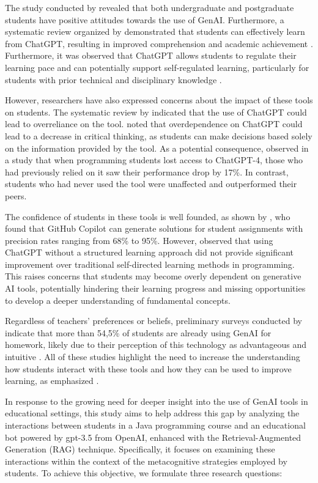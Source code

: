 \documentclass[a4paper,twoside]{article}
\begin{document}
The study conducted by \cite{chan23} revealed that both undergraduate and
postgraduate students have positive attitudes towards the use of GenAI.
Furthermore, a systematic review organized by \cite{Lo24} demonstrated that
students can effectively learn from ChatGPT, resulting in improved comprehension
and academic achievement \citep{Callejo24}. Furthermore, it was observed that
ChatGPT allows students to regulate their learning pace \citep{Baha24} and can
potentially support self-regulated learning, particularly for students with
prior technical and disciplinary knowledge \citep{Xia23}.

However, researchers have also expressed concerns about the impact of these
tools on students. The systematic review by \cite{Murillo23} indicated that the
use of ChatGPT could lead to overreliance on the tool. \cite{chan23} noted that
overdependence on ChatGPT could lead to a decrease in critical thinking, as
students can make decisions based solely on the information provided by the tool.
As a potential consequence, \cite{Bastani24} observed in a study that when
programming students lost access to ChatGPT-4, those who had previously relied
on it saw their performance drop by 17\%. In contrast, students who had never
used the tool were unaffected and outperformed their peers.

The confidence of students in these tools is well founded, as shown by
\cite{Puryear22}, who found that GitHub Copilot can generate solutions for
student assignments with precision rates ranging from 68\% to 95\%. However,
\cite{Boudouaia24} observed that using ChatGPT without a structured learning
approach did not provide significant improvement over traditional self-directed
learning methods in programming. This raises concerns that students may become
overly dependent on generative AI tools, potentially hindering their learning
progress and missing opportunities to develop a deeper understanding of
fundamental concepts.

Regardless of teachers' preferences or beliefs, preliminary surveys conducted
by \cite{Dickey24} indicate that more than 54,5\% of students are already using
GenAI for homework, likely due to their perception of this technology as
advantageous and intuitive \citep{Boudouaia24}. All of these studies highlight
the need to increase the understanding how students interact with these tools
and how they can be used to improve learning, as emphasized \cite{Lo24}.

In response to the growing need for deeper insight into the use of GenAI tools
in educational settings, this study aims to help address this gap by analyzing
the interactions between students in a Java programming course and an
educational bot powered by gpt-3.5 from OpenAI, enhanced with the
Retrieval-Augmented Generation (RAG) technique. Specifically, it focuses on
examining these interactions within the context of the metacognitive strategies
employed by students. To achieve this objective, we formulate three research
questions:
\end{document}
